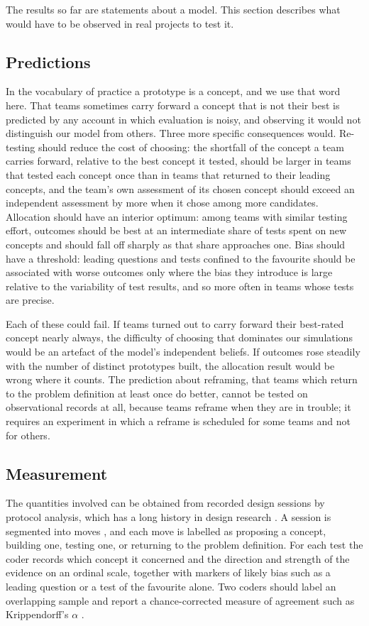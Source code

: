 \documentclass[10pt,twocolumn]{article}
\theoremstyle{definition}
\begin{document}
The results so far are statements about a model. This section describes what would have to be observed in real projects to test it.

\subsection{Predictions}

In the vocabulary of practice a prototype is a concept, and we use that word here. That teams sometimes carry forward a concept that is not their best is predicted by any account in which evaluation is noisy, and observing it would not distinguish our model from others. Three more specific consequences would. Re-testing should reduce the cost of choosing: the shortfall of the concept a team carries forward, relative to the best concept it tested, should be larger in teams that tested each concept once than in teams that returned to their leading concepts, and the team's own assessment of its chosen concept should exceed an independent assessment by more when it chose among more candidates. Allocation should have an interior optimum: among teams with similar testing effort, outcomes should be best at an intermediate share of tests spent on new concepts and should fall off sharply as that share approaches one. Bias should have a threshold: leading questions and tests confined to the favourite should be associated with worse outcomes only where the bias they introduce is large relative to the variability of test results, and so more often in teams whose tests are precise.

Each of these could fail. If teams turned out to carry forward their best-rated concept nearly always, the difficulty of choosing that dominates our simulations would be an artefact of the model's independent beliefs. If outcomes rose steadily with the number of distinct prototypes built, the allocation result would be wrong where it counts. The prediction about reframing, that teams which return to the problem definition at least once do better, cannot be tested on observational records at all, because teams reframe when they are in trouble; it requires an experiment in which a reframe is scheduled for some teams and not for others.

\subsection{Measurement}

The quantities involved can be obtained from recorded design sessions by protocol analysis, which has a long history in design research \citep{cross1996}. A session is segmented into moves \citep{goldschmidt2014}, and each move is labelled as proposing a concept, building one, testing one, or returning to the problem definition. For each test the coder records which concept it concerned and the direction and strength of the evidence on an ordinal scale, together with markers of likely bias such as a leading question or a test of the favourite alone. Two coders should label an overlapping sample and report a chance-corrected measure of agreement such as Krippendorff's $\alpha$ \citep{krippendorff2018}.
\end{document}

